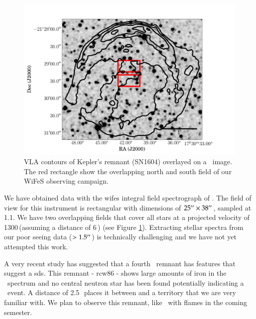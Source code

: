 \begin{figure}[tb] %
   \centering
   \includegraphics[width=\textwidth, trim=0 0 2cm 0, clip]{chapter_conclusion/plots/sn1604_overlay.pdf} 
   \caption[VLA contours of Kepler's remnant (SN1604) overlayed on a 2MASS image]{VLA contours of Kepler's remnant (SN1604) overlayed on a \twomass\ image. The red rectangle show the overlapping north and south field of our WiFeS observing campaign.}
   \label{fig:sn1604_observations}
\end{figure}

We have obtained data with the \gls{wifes} integral field spectrograph of . The field of view for this instrument is rectangular with dimensions of $25\hbox{$^{\prime\prime}$} \times 38\hbox{$^{\prime\prime}$}$, sampled at 1.1\arcsec. We have two overlapping fields that cover all stars at a projected velocity of 1300\,\kms (assuming a distance of 6\,\kpc) (see Figure \ref{fig:sn1604_observations}). Extracting stellar spectra from our poor seeing data ($> 1.5\hbox{$^{\prime\prime}$}$) is technically challenging and we have not yet attempted this work.

A very recent study \citep{2011arXiv1108.1207W} has suggested that a fourth \snia\ remnant has features that suggest a \gls{sds}. This remnant - \gls{rcw86} - shows large amounts of iron in the \xray\ spectrum and no central neutron star has been found potentially indicating a \snia\ event. A distance of 2.5\,\kpc\ places it between  and  a territory that we are very familiar with. We plan to observe this remnant, like \ with \gls{flames} in the coming semester.



